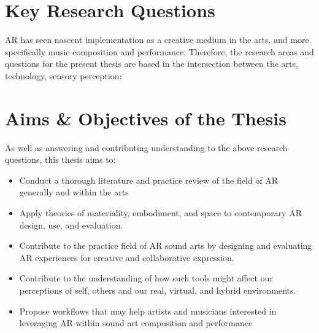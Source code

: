 \section{Key Research Questions}\label{sec: introduction-researchquestions}
AR has seen nascent implementation as a creative medium in the arts, and more specifically music composition and performance. Therefore, the research areas and questions for the present thesis are based in the intersection between the arts, technology, sensory perception:

\RQall

\section{Aims \& Objectives of the Thesis}\label{sec: introduction-aims}
As well as answering and contributing understanding to the above research questions, this thesis aims to:

\begin{itemize}
    \item Conduct a thorough literature and practice review of the field of AR generally and within the arts
    \item Apply theories of materiality, embodiment, and space to contemporary AR design, use, and evaluation.
    \item Contribute to the practice field of AR sound arts by designing and evaluating AR experiences for creative and collaborative expression.
    \item Contribute to the understanding of how such tools might affect our perceptions of self, others and our real, virtual, and hybrid environments. 
    \item Propose workflows that may help artists and musicians interested in leveraging AR within sound art composition and performance
\end{itemize}




